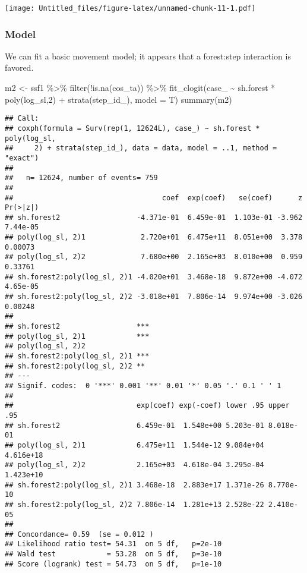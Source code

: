 \documentclass[
]{article}
\newenvironment{Shaded}{\begin{snugshade}}{\end{snugshade}}
\newcommand{\AttributeTok}[1]{\textcolor[rgb]{0.77,0.63,0.00}{#1}}
\newcommand{\DecValTok}[1]{\textcolor[rgb]{0.00,0.00,0.81}{#1}}
\newcommand{\FunctionTok}[1]{\textcolor[rgb]{0.00,0.00,0.00}{#1}}
\newcommand{\NormalTok}[1]{#1}
\newcommand{\OtherTok}[1]{\textcolor[rgb]{0.56,0.35,0.01}{#1}}
\newcommand{\SpecialCharTok}[1]{\textcolor[rgb]{0.00,0.00,0.00}{#1}}
\begin{document}
\texttt{[image: Untitled\_files/figure-latex/unnamed-chunk-11-1.pdf]}

\hypertarget{model}{%
\subsubsection{Model}\label{model}}

We can fit a basic movement model; it appears that a forest:step
interaction is favored.

\begin{Shaded}
\begin{Highlighting}[]
\NormalTok{m2 }\OtherTok{\textless{}{-}}\NormalTok{ ssf1 }\SpecialCharTok{\%\textgreater{}\%}
  \FunctionTok{filter}\NormalTok{(}\SpecialCharTok{!}\FunctionTok{is.na}\NormalTok{(cos\_ta)) }\SpecialCharTok{\%\textgreater{}\%} 
  \FunctionTok{fit\_clogit}\NormalTok{(case\_ }\SpecialCharTok{\textasciitilde{}}\NormalTok{ sh.forest }\SpecialCharTok{*} \FunctionTok{poly}\NormalTok{(log\_sl,}\DecValTok{2}\NormalTok{) }\SpecialCharTok{+} \FunctionTok{strata}\NormalTok{(step\_id\_), }\AttributeTok{model =}\NormalTok{ T)}
\FunctionTok{summary}\NormalTok{(m2)}
\end{Highlighting}
\end{Shaded}

\begin{verbatim}
## Call:
## coxph(formula = Surv(rep(1, 12624L), case_) ~ sh.forest * poly(log_sl, 
##     2) + strata(step_id_), data = data, model = ..1, method = "exact")
## 
##   n= 12624, number of events= 759 
## 
##                                   coef  exp(coef)   se(coef)      z Pr(>|z|)
## sh.forest2                  -4.371e-01  6.459e-01  1.103e-01 -3.962 7.44e-05
## poly(log_sl, 2)1             2.720e+01  6.475e+11  8.051e+00  3.378  0.00073
## poly(log_sl, 2)2             7.680e+00  2.165e+03  8.010e+00  0.959  0.33761
## sh.forest2:poly(log_sl, 2)1 -4.020e+01  3.468e-18  9.872e+00 -4.072 4.65e-05
## sh.forest2:poly(log_sl, 2)2 -3.018e+01  7.806e-14  9.974e+00 -3.026  0.00248
##                                
## sh.forest2                  ***
## poly(log_sl, 2)1            ***
## poly(log_sl, 2)2               
## sh.forest2:poly(log_sl, 2)1 ***
## sh.forest2:poly(log_sl, 2)2 ** 
## ---
## Signif. codes:  0 '***' 0.001 '**' 0.01 '*' 0.05 '.' 0.1 ' ' 1
## 
##                             exp(coef) exp(-coef) lower .95 upper .95
## sh.forest2                  6.459e-01  1.548e+00 5.203e-01 8.018e-01
## poly(log_sl, 2)1            6.475e+11  1.544e-12 9.084e+04 4.616e+18
## poly(log_sl, 2)2            2.165e+03  4.618e-04 3.295e-04 1.423e+10
## sh.forest2:poly(log_sl, 2)1 3.468e-18  2.883e+17 1.371e-26 8.770e-10
## sh.forest2:poly(log_sl, 2)2 7.806e-14  1.281e+13 2.528e-22 2.410e-05
## 
## Concordance= 0.59  (se = 0.012 )
## Likelihood ratio test= 54.31  on 5 df,   p=2e-10
## Wald test            = 53.28  on 5 df,   p=3e-10
## Score (logrank) test = 54.73  on 5 df,   p=1e-10
\end{verbatim}
\end{document}
